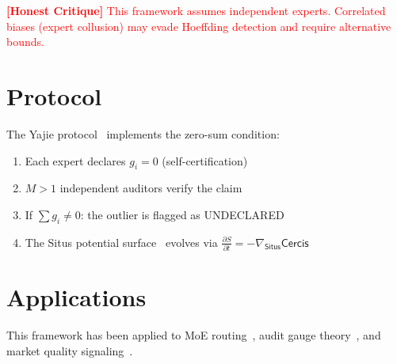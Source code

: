 \documentclass{article}
\theoremstyle{remark}
\newcommand{\Yajie}{\textsf{Yajie}}
\newcommand{\Cercis}{\textsf{Cercis}}
\newcommand{\Situs}{\textsf{Situs}}
\newcommand{\honestcrit}[1]{\textcolor{red}{\textbf{[Honest Critique]} #1}}
\begin{document}
\honestcrit{This framework assumes independent experts. Correlated biases (expert collusion) may evade Hoeffding detection and require alternative bounds.}

\section{Protocol}

The \Yajie{} protocol~\cite{yajie2026} implements the zero-sum condition:
\begin{enumerate}
\item Each expert declares $g_i = 0$ (self-certification)
\item $M > 1$ independent auditors verify the claim
\item If $\sum g_i \neq 0$: the outlier is flagged as UNDECLARED
\item The \Situs{} potential surface~\cite{spring2026} evolves via $\frac{\partial S}{\partial t} = -\nabla_{\Situs} \Cercis$
\end{enumerate}

\section{Applications}

This framework has been applied to MoE routing~\cite{moe_gauge2026}, audit gauge theory~\cite{qft_sm2026}, and market quality signaling~\cite{akerlof1970}.



\end{document}
